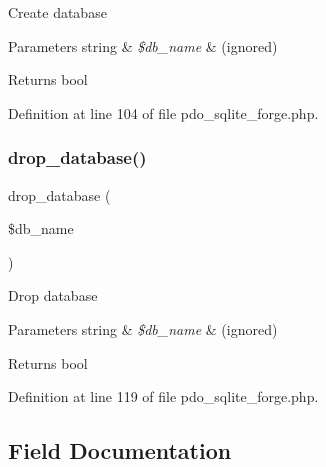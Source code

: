 Create database


\begin{DoxyParams}[1]{Parameters}
string & {\em \$db\+\_\+name} & (ignored) \\
\hline
\end{DoxyParams}
\begin{DoxyReturn}{Returns}
bool 
\end{DoxyReturn}


Definition at line 104 of file pdo\+\_\+sqlite\+\_\+forge.\+php.

\mbox{\label{class_c_i___d_b__pdo__sqlite__forge_a9612987b2d4230de2638d15857e92e67}} 
\subsubsection{\texorpdfstring{drop\_database()}{drop\_database()}}
{\footnotesize\ttfamily drop\+\_\+database (\begin{DoxyParamCaption}\item[{}]{\$db\+\_\+name }\end{DoxyParamCaption})}

Drop database


\begin{DoxyParams}[1]{Parameters}
string & {\em \$db\+\_\+name} & (ignored) \\
\hline
\end{DoxyParams}
\begin{DoxyReturn}{Returns}
bool 
\end{DoxyReturn}


Definition at line 119 of file pdo\+\_\+sqlite\+\_\+forge.\+php.



\subsection{Field Documentation}
\mbox{\label{class_c_i___d_b__pdo__sqlite__forge_a2f6484fcb8d1dc3eef67a637227cd583}} 
